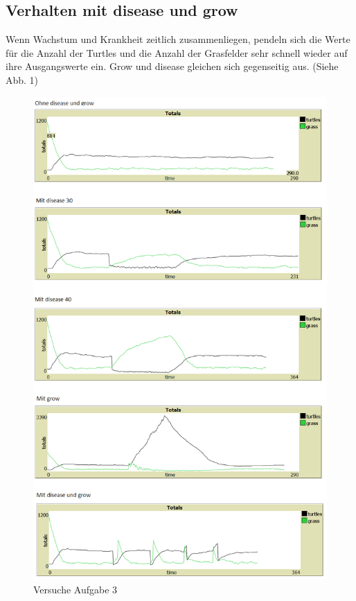 \documentclass[10pt]{article}%
\theoremstyle{nonumberplain}
\begin{document}
\subsection{Verhalten mit disease und grow}
Wenn Wachstum und Krankheit zeitlich zusammenliegen, pendeln sich die Werte für die Anzahl der Turtles und die Anzahl der Grasfelder sehr schnell wieder auf ihre Ausgangswerte ein. Grow und disease gleichen sich gegenseitig aus. (Siehe Abb. 1) 


\begin{figure}
	\centering
  \includegraphics [scale = 0.56]{Blatt 1 - 3 Bild.png}
\caption{Versuche Aufgabe 3}
\label{Abb1}
\end{figure}
\end{document}

